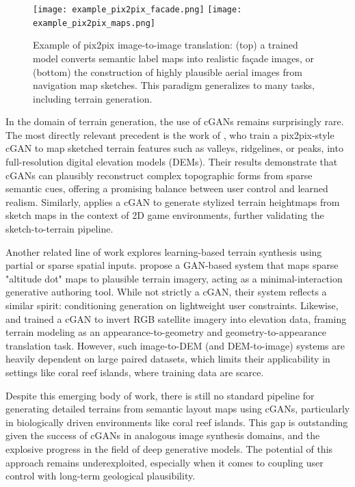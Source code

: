\begin{figure}[H]
\centering
\texttt{[image: example\_pix2pix\_facade.png]}
\texttt{[image: example\_pix2pix\_maps.png]}
\caption{Example of pix2pix image-to-image translation: (top) a trained model converts semantic label maps into realistic façade images, or (bottom) the construction of highly plausible aerial images from navigation map sketches. This paradigm generalizes to many tasks, including terrain generation.}
\label{fig:coral-island_pix2pix-example}
\end{figure}

In the domain of terrain generation, the use of cGANs remains surprisingly rare. The most directly relevant precedent is the work of \citep{Guerin2017}, who train a pix2pix-style cGAN to map sketched terrain features such as valleys, ridgelines, or peaks, into full-resolution digital elevation models (DEMs). Their results demonstrate that cGANs can plausibly reconstruct complex topographic forms from sparse semantic cues, offering a promising balance between user control and learned realism. Similarly, \citep{Sisodia2022} applies a cGAN to generate stylized terrain heightmaps from sketch maps in the context of 2D game environments, further validating the sketch-to-terrain pipeline.

Another related line of work explores learning-based terrain synthesis using partial or sparse spatial inputs. \citep{Voulgaris2021} propose a GAN-based system that maps sparse "altitude dot" maps to plausible terrain imagery, acting as a minimal-interaction generative authoring tool. While not strictly a cGAN, their system reflects a similar spirit: conditioning generation on lightweight user constraints. Likewise, \cite{Panagiotou2020} and \cite{Beckham2017} trained a cGAN to invert RGB satellite imagery into elevation data, framing terrain modeling as an appearance-to-geometry and geometry-to-appearance translation task. However, such image-to-DEM (and DEM-to-image) systems are heavily dependent on large paired datasets, which limits their applicability in settings like coral reef islands, where training data are scarce.

Despite this emerging body of work, there is still no standard pipeline for generating detailed terrains from semantic layout maps using cGANs, particularly in biologically driven environments like coral reef islands. This gap is outstanding given the success of cGANs in analogous image synthesis domains, and the explosive progress in the field of deep generative models. The potential of this approach remains underexploited, especially when it comes to coupling user control with long-term geological plausibility.

